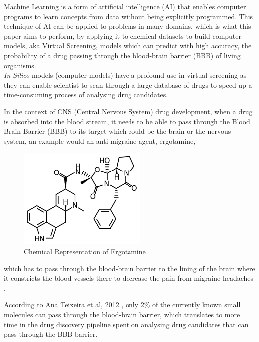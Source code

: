 \documentclass[a4paper,12pt]{report}
\begin{document}
	Machine Learning is a form of artificial intelligence (AI) that enables computer programs to learn concepts from data without being explicitly programmed. This technique of AI can be applied to problems in many domains, which is what this paper aims to perform, by applying it to chemical datasets to build computer models, aka Virtual Screening, models which can predict with high accuracy, the probability of a drug passing through the blood-brain barrier (BBB) of living organisms. 
	\\
	
	\textit{In Silico} models (computer models) have a profound use in virtual screening as they can enable scientist to scan through a large database of drugs to speed up a time-consuming process of analysing drug candidates. 
	
	In the context of CNS (Central Nervous System) drug development, when a drug is absorbed into the blood stream, it needs to be able to pass through the Blood Brain Barrier (BBB) to its target which could be the brain or the nervous system, an example would an anti-migraine agent, ergotamine, 
		\begin{figure}[H]
			\centering
			\includegraphics[scale=1,width=0.55\textwidth,totalheight=0.3\textheight]{images/Ergotamine-skeletal} 
			\caption{Chemical Representation of Ergotamine}
			\label{fig:ergotamine}
		\end{figure}
	which has to pass through the blood-brain barrier to the lining of the brain where it constricts the blood vessels there to decrease the pain from migraine headaches \cite{DrugsCom}. 

	According to Ana Teixeira et al, 2012 \cite{Anaetal2012}, only 2\% of the currently known small molecules can pass through the blood-brain barrier, which translates to more time in the drug discovery pipeline spent on analysing drug candidates that can pass through the BBB barrier. \\
\end{document}
